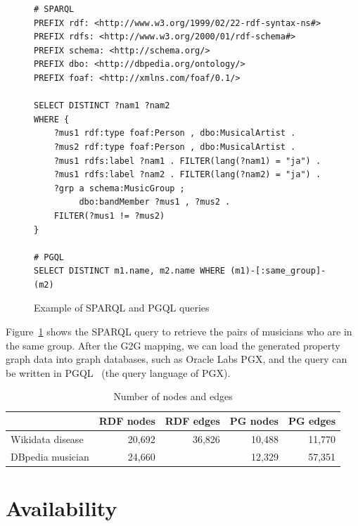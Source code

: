 \documentclass[runningheads]{llncs}
\begin{document}
\begin{figure}[!t]
\vspace{2mm}
\begin{scriptsize}
\begin{verbatim}
# SPARQL
PREFIX rdf: <http://www.w3.org/1999/02/22-rdf-syntax-ns#>
PREFIX rdfs: <http://www.w3.org/2000/01/rdf-schema#>
PREFIX schema: <http://schema.org/>
PREFIX dbo: <http://dbpedia.org/ontology/>
PREFIX foaf: <http://xmlns.com/foaf/0.1/>
 
SELECT DISTINCT ?nam1 ?nam2
WHERE {
    ?mus1 rdf:type foaf:Person , dbo:MusicalArtist .
    ?mus2 rdf:type foaf:Person , dbo:MusicalArtist .
    ?mus1 rdfs:label ?nam1 . FILTER(lang(?nam1) = "ja") .
    ?mus1 rdfs:label ?nam2 . FILTER(lang(?nam2) = "ja") .
    ?grp a schema:MusicGroup ;
         dbo:bandMember ?mus1 , ?mus2 .
    FILTER(?mus1 != ?mus2)
}
 
# PGQL
SELECT DISTINCT m1.name, m2.name WHERE (m1)-[:same_group]-(m2)
\end{verbatim}
\end{scriptsize}
\caption{Example of SPARQL and PGQL queries}
\label{fig:sparql}
\end{figure}
 
Figure~\ref{fig:sparql} shows the SPARQL query to retrieve the pairs of musicians who are in the same group. After the G2G mapping, we can load the generated property graph data into graph databases, such as Oracle Labs PGX, and the query can be written in PGQL~\cite{pgql} (the query language of PGX).

\begin{table}[h]
    \centering
    \begin{tabular}{l|r|r|r|r}
        \hline
        & RDF nodes & RDF edges & PG nodes & PG edges \\
        \hline
        Wikidata disease & 20,692 & 36,826 & 10,488 & 11,770 \\
        DBpedia musician & 24,660 &  & 12,329 & 57,351 \\
        \hline
    \end{tabular}
    \caption{Number of nodes and edges}
    \label{tab:my_label}
\end{table}


\section{Availability}
\end{document}
